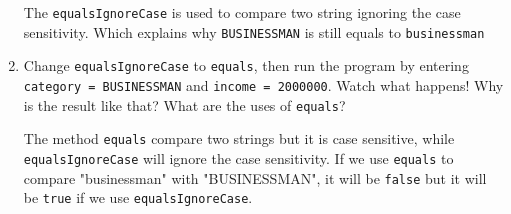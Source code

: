 \documentclass[12pt,titlepage]{article}
\begin{document}
\begin{enumerate}
{        The \texttt{equalsIgnoreCase} is used to compare two string ignoring the case sensitivity.
        Which explains why \texttt{BUSINESSMAN} is still equals to \texttt{businessman}
    }
    \item {
        Change \texttt{equalsIgnoreCase} to \texttt{equals}, then run the program by entering 
        \texttt{category = BUSINESSMAN} and \texttt{income = 2000000}. Watch what happens!
        Why is the result like that? What are the uses of \texttt{equals}?

        The method \texttt{equals} compare two strings but it is case sensitive, while \texttt{equalsIgnoreCase} will
        ignore the case sensitivity. If we use \texttt{equals} to compare "businessman" with "BUSINESSMAN",
        it will be \texttt{false} but it will be \texttt{true} if we use \texttt{equalsIgnoreCase}.
    }
\end{enumerate}
\pagebreak
\end{document}
